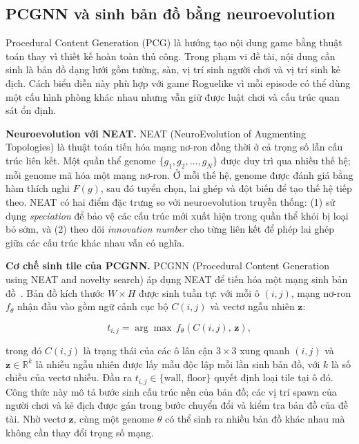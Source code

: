 \subsection{PCGNN và sinh bản đồ bằng neuroevolution}

Procedural Content Generation (PCG) là hướng tạo nội dung game bằng thuật toán thay vì thiết kế hoàn toàn thủ công. Trong phạm vi đề tài, nội dung cần sinh là bản đồ dạng lưới gồm tường, sàn, vị trí sinh người chơi và vị trí sinh kẻ địch. Cách biểu diễn này phù hợp với game Roguelike vì mỗi episode có thể dùng một cấu hình phòng khác nhau nhưng vẫn giữ được luật chơi và cấu trúc quan sát ổn định.

\textbf{Neuroevolution với NEAT.} NEAT (NeuroEvolution of Augmenting Topologies) là thuật toán tiến hóa mạng nơ-ron đồng thời ở cả trọng số lẫn cấu trúc liên kết. Một quần thể genome $\{g_1, g_2, \ldots, g_N\}$ được duy trì qua nhiều thế hệ; mỗi genome mã hóa một mạng nơ-ron. Ở mỗi thế hệ, genome được đánh giá bằng hàm thích nghi $F(g)$, sau đó tuyển chọn, lai ghép và đột biến để tạo thế hệ tiếp theo. NEAT có hai điểm đặc trưng so với neuroevolution truyền thống: (1) sử dụng \textit{speciation} để bảo vệ các cấu trúc mới xuất hiện trong quần thể khỏi bị loại bỏ sớm, và (2) theo dõi \textit{innovation number} cho từng liên kết để phép lai ghép giữa các cấu trúc khác nhau vẫn có nghĩa.

\textbf{Cơ chế sinh tile của PCGNN.} PCGNN (Procedural Content Generation using NEAT and novelty search) áp dụng NEAT để tiến hóa một mạng sinh bản đồ~\cite{Beukman2022}. Bản đồ kích thước $W \times H$ được sinh tuần tự: với mỗi ô $(i,j)$, mạng nơ-ron $f_\theta$ nhận đầu vào gồm ngữ cảnh cục bộ $C(i,j)$ và vectơ ngẫu nhiên $\mathbf{z}$:

\begin{equation}
    t_{i,j} = \arg\max\, f_\theta\!\left(C(i,j),\, \mathbf{z}\right),
    \label{eq:pcgnn_tile}
\end{equation}

trong đó $C(i,j)$ là trạng thái của các ô lân cận $3\times 3$ xung quanh $(i,j)$ và $\mathbf{z} \in \mathbb{R}^k$ là nhiễu ngẫu nhiên được lấy mẫu độc lập mỗi lần sinh bản đồ, với $k$ là số chiều của vectơ nhiễu. Đầu ra $t_{i,j} \in \{\text{wall},\, \text{floor}\}$ quyết định loại tile tại ô đó. Công thức này mô tả bước sinh cấu trúc nền của bản đồ; các vị trí spawn của người chơi và kẻ địch được gán trong bước chuyển đổi và kiểm tra bản đồ của đề tài. Nhờ vectơ $\mathbf{z}$, cùng một genome $\theta$ có thể sinh ra nhiều bản đồ khác nhau mà không cần thay đổi trọng số mạng.

